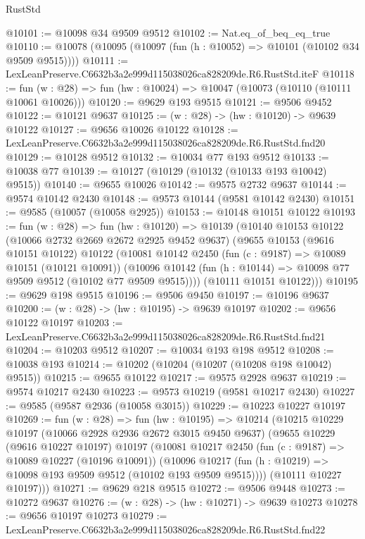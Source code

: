 \begin{lexlean}{RustStd}
\begin{coremodule}
@10101 := @10098 @34 @9509 @9512
@10102 := Nat.eq_of_beq_eq_true
@10110 := @10078 (@10095 (@10097 (fun (h : @10052) => @10101 (@10102 @34 @9509 @9515))))
@10111 := LexLeanPreserve.C6632b3a2e999d115038026ca828209de.R6.RustStd.iteF
@10118 := fun (w : @28) => fun (hw : @10024) => @10047 (@10073 (@10110 (@10111 @10061 @10026)))
@10120 := @9629 @193 @9515
@10121 := @9506 @9452
@10122 := @10121 @9637
@10125 := (w : @28) -> (hw : @10120) -> @9639 @10122
@10127 := @9656 @10026 @10122
@10128 := LexLeanPreserve.C6632b3a2e999d115038026ca828209de.R6.RustStd.fnd20
@10129 := @10128 @9512
@10132 := @10034 @77 @193 @9512
@10133 := @10038 @77
@10139 := @10127 (@10129 (@10132 (@10133 @193 @10042) @9515))
@10140 := @9655 @10026
@10142 := @9575 @2732 @9637
@10144 := @9574 @10142 @2430
@10148 := @9573 @10144 (@9581 @10142 @2430)
@10151 := @9585 (@10057 (@10058 @2925))
@10153 := @10148 @10151 @10122
@10193 := fun (w : @28) =>
  fun (hw : @10120) =>
  @10139
    (@10140
      @10153
      @10122
      (@10066 @2732 @2669 @2672 @2925 @9452 @9637)
      (@9655
        @10153
        (@9616 @10151 @10122)
        @10122
        (@10081
          @10142
          @2450
          (fun (c : @9187) => @10089 @10151 (@10121 @10091))
          (@10096 @10142 (fun (h : @10144) => @10098 @77 @9509 @9512 (@10102 @77 @9509 @9515))))
        (@10111 @10151 @10122)))
@10195 := @9629 @198 @9515
@10196 := @9506 @9450
@10197 := @10196 @9637
@10200 := (w : @28) -> (hw : @10195) -> @9639 @10197
@10202 := @9656 @10122 @10197
@10203 := LexLeanPreserve.C6632b3a2e999d115038026ca828209de.R6.RustStd.fnd21
@10204 := @10203 @9512
@10207 := @10034 @193 @198 @9512
@10208 := @10038 @193
@10214 := @10202 (@10204 (@10207 (@10208 @198 @10042) @9515))
@10215 := @9655 @10122
@10217 := @9575 @2928 @9637
@10219 := @9574 @10217 @2430
@10223 := @9573 @10219 (@9581 @10217 @2430)
@10227 := @9585 (@9587 @2936 (@10058 @3015))
@10229 := @10223 @10227 @10197
@10269 := fun (w : @28) =>
  fun (hw : @10195) =>
  @10214
    (@10215
      @10229
      @10197
      (@10066 @2928 @2936 @2672 @3015 @9450 @9637)
      (@9655
        @10229
        (@9616 @10227 @10197)
        @10197
        (@10081
          @10217
          @2450
          (fun (c : @9187) => @10089 @10227 (@10196 @10091))
          (@10096 @10217 (fun (h : @10219) => @10098 @193 @9509 @9512 (@10102 @193 @9509 @9515))))
        (@10111 @10227 @10197)))
@10271 := @9629 @218 @9515
@10272 := @9506 @9448
@10273 := @10272 @9637
@10276 := (w : @28) -> (hw : @10271) -> @9639 @10273
@10278 := @9656 @10197 @10273
@10279 := LexLeanPreserve.C6632b3a2e999d115038026ca828209de.R6.RustStd.fnd22

\end{coremodule}
\end{lexlean}
